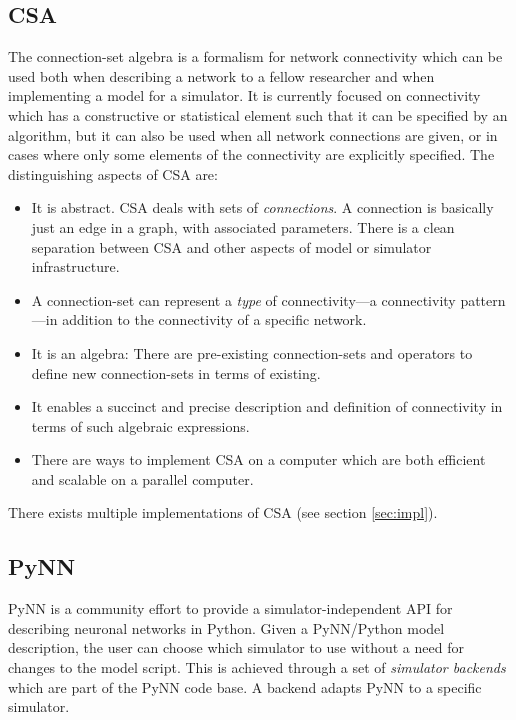 \documentclass{frontiersSCNS} %
\begin{document}
\subsection{CSA}
The connection-set algebra \citep[CSA;][]{djurfeldt12} is a formalism
for network connectivity which can be used both when describing a
network to a fellow researcher and when implementing a model for a
simulator.  It is currently focused on connectivity which has a
constructive or statistical element such that it can be specified by
an algorithm, but it can also be used when all network connections are
given, or in cases where only some elements of the connectivity are
explicitly specified. The distinguishing aspects of CSA are:
\begin{itemize}
\item It is abstract. CSA deals with sets of \emph{connections}. A
  connection is basically just an edge in a graph, with associated
  parameters. There is a clean separation between CSA and other
  aspects of model or simulator infrastructure.
\item A connection-set can represent a \emph{type} of
  connectivity---a connectivity pattern---in addition to the connectivity
  of a specific network.
\item It is an algebra: There are pre-existing connection-sets and
  operators to define new connection-sets in terms of existing.
\item It enables a succinct and precise description and definition of
  connectivity in terms of such algebraic expressions.
\item There are ways to implement CSA on a computer which are both
  efficient and scalable on a parallel computer.
\end{itemize}
There exists multiple implementations of CSA (see section
\ref{sec:impl}).

\subsection{PyNN}

PyNN \citep[http://www.neuralensemble.org/PyNN;][]{Davison09} is a
community effort to provide a simulator-independent API for describing
neuronal networks in Python. Given a PyNN/Python model description,
the user can choose which simulator to use without a need for changes
to the model script. This is achieved through a set of \emph{simulator
backends} which are part of the PyNN code base. A backend adapts
PyNN to a specific simulator.
\end{document}
